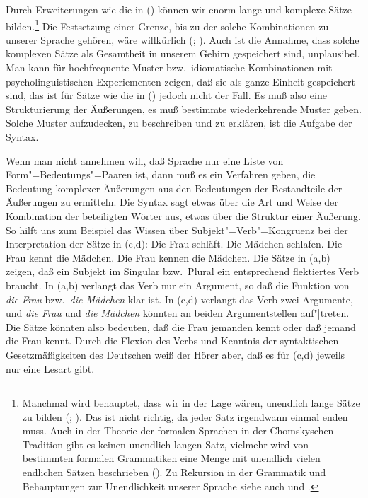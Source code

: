 Durch Erweiterungen wie die in () können wir enorm lange und komplexe Sätze bilden.\footnote{
Manchmal wird behauptet, dass wir in der Lage wären, unendlich lange Sätze zu bilden (\citealp*[]{NKN2001a}; \citealp[]{KS2008a-u}). Das ist nicht richtig, da jeder Satz irgendwann einmal enden
 muss. Auch in der Theorie der formalen Sprachen in der Chomskyschen Tradition gibt es keinen
 unendlich langen Satz, vielmehr wird von bestimmten formalen Grammatiken eine Menge mit unendlich
 vielen endlichen Sätzen beschrieben (\citealp[]{Chomsky57a}). Zu Rekursion in
 der Grammatik und Behauptungen zur Unendlichkeit unserer Sprache siehe auch  und
 .
} Die Festsetzung einer Grenze, bis zu der solche Kombinationen zu unserer Sprache gehören, wäre
willkürlich (\citealp[]{Harris57a}; \citealp[]{Chomsky57a}). Auch ist die Annahme, dass
solche komplexen Sätze als Gesamtheit in unserem Gehirn gespeichert sind, unplausibel. Man kann für
hochfrequente Muster bzw.\ idiomatische Kombinationen mit psycholinguistischen Experiementen zeigen,
daß sie als ganze Einheit gespeichert sind, das ist für Sätze wie die in () jedoch nicht der
Fall. Es muß also eine Strukturierung der Äußerungen, es muß bestimmte wiederkehrende Muster
geben. Solche Muster aufzudecken, zu beschreiben und zu erklären, ist die Aufgabe der Syntax.

Wenn man nicht annehmen will, daß Sprache nur eine Liste von Form"=Bedeutungs"=Paaren
ist, dann muß es ein Verfahren geben, die Bedeutung komplexer Äußerungen aus
den Bedeutungen der Bestandteile der Äußerungen zu ermitteln.
Die Syntax sagt etwas über die Art und Weise der Kombination der beteiligten
Wörter aus, etwas über die Struktur einer Äußerung.
So hilft uns zum Beispiel das Wissen über Subjekt"=Verb"=Kongruenz bei der Interpretation
der Sätze in (c,d):
\eal
\ex Die Frau schläft.
\ex Die Mädchen schlafen.
\ex Die Frau kennt  die Mädchen.
\ex Die Frau kennen die Mädchen.
\zl
Die Sätze in (a,b) zeigen, daß ein Subjekt im Singular bzw.\ Plural
ein entsprechend flektiertes Verb braucht. In (a,b) verlangt das Verb nur ein
Argument, so daß die Funktion von \emph{die Frau} bzw.\ \emph{die Mädchen} klar ist.
In (c,d) verlangt das Verb zwei Argumente, und \emph{die Frau} und \emph{die Mädchen}
könnten an beiden Argumentstellen auf"|treten. Die Sätze könnten also bedeuten, daß
die Frau jemanden kennt oder daß jemand die Frau kennt. Durch die Flexion des Verbs und
Kenntnis der syntaktischen Gesetzmäßigkeiten des Deutschen weiß der Hörer
aber, daß es für (c,d) jeweils nur eine Lesart gibt.



